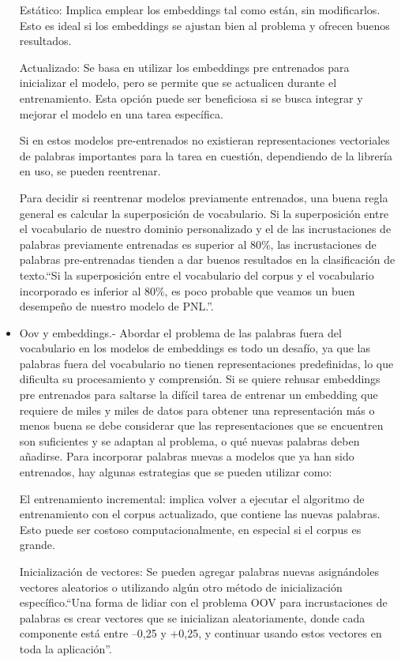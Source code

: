 \begin{itemize}
Estático: Implica emplear los embeddings tal como están, sin modificarlos. Esto es ideal si los embeddings se ajustan bien al problema y ofrecen buenos resultados.

Actualizado: Se basa en utilizar los embeddings pre entrenados para inicializar el modelo, pero se permite que se actualicen durante el entrenamiento. Esta opción puede ser beneficiosa si se busca integrar y mejorar el modelo en una tarea específica.

Si en estos modelos pre-entrenados no existieran representaciones vectoriales de palabras importantes para la tarea en cuestión, dependiendo de la librería en uso, se pueden reentrenar. 

Para decidir si reentrenar modelos previamente entrenados, una buena regla general es calcular la superposición de vocabulario. Si la superposición entre el vocabulario de nuestro dominio personalizado y el de las incrustaciones de palabras previamente entrenadas es superior al 80\%, las incrustaciones de palabras pre-entrenadas tienden a dar buenos resultados en la clasificación de texto.``Si la superposición entre el vocabulario del corpus y el vocabulario incorporado es inferior al 80\%, es poco probable que veamos un buen desempeño de nuestro modelo de PNL.''\cite[p. 104]{vajjala2020practical}.

	\item Oov y embeddings.- Abordar el problema de las palabras fuera del vocabulario en los modelos de embeddings es todo un desafío, ya que  las palabras fuera del vocabulario no tienen representaciones predefinidas, lo que dificulta su procesamiento y comprensión. Si se quiere rehusar embeddings pre entrenados para saltarse la difícil tarea de entrenar un embedding que requiere de miles y miles de datos para obtener una representación más o menos buena se debe considerar que las representaciones que se encuentren son suficientes y se adaptan al problema, o qué nuevas palabras deben añadirse. Para incorporar palabras nuevas a modelos que ya han sido entrenados, hay algunas estrategias que se pueden utilizar como:

El entrenamiento incremental: implica volver a ejecutar el algoritmo de entrenamiento con el corpus actualizado, que contiene las nuevas palabras. Esto puede ser costoso computacionalmente, en especial si el corpus es grande. 

Inicialización de vectores: Se pueden agregar palabras nuevas asignándoles vectores aleatorios o utilizando algún otro método de inicialización específico.``Una forma de lidiar con el problema OOV para incrustaciones de palabras es crear vectores que se inicializan aleatoriamente, donde cada componente está entre –0,25 y +0,25, y continuar usando estos vectores en toda la aplicación''\cite[p. 105]{vajjala2020practical}.


\end{itemize}
